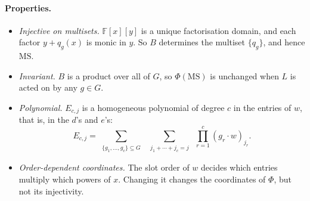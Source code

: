 \documentclass[11pt]{article}
\theoremstyle{definition}
\theoremstyle{remark}
\newcommand{\F}{\mathbb{F}}
\newcommand{\MS}{\mathrm{MS}}
\begin{document}
\paragraph{Properties.}
\begin{itemize}
  \item \emph{Injective on multisets.} $\F[x][y]$ is a unique factorisation
    domain, and each factor $y + q_g(x)$ is monic in $y$. So $B$ determines
    the multiset $\{q_g\}$, and hence $\MS$.
  \item \emph{Invariant.} $B$ is a product over all of $G$, so $\Phi(\MS)$ is
    unchanged when $L$ is acted on by any $g \in G$.
  \item \emph{Polynomial.} $E_{c,j}$ is a homogeneous polynomial of
    degree $c$ in the entries of $w$, that is, in the $d$'s and $e$'s:
    \[
      E_{c,j} = \sum_{\substack{\{g_1, \ldots, g_c\} \subseteq G}} \;
      \sum_{\substack{j_1 + \cdots + j_c = j}} \;
      \prod_{r=1}^{c} (g_r \cdot w)_{j_r}.
    \]
  \item \emph{Order-dependent coordinates.} The slot order of $w$ decides
    which entries multiply which powers of $x$. Changing it changes the
    coordinates of $\Phi$, but not its injectivity.
\end{itemize}
\end{document}
